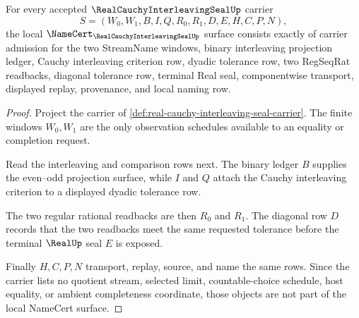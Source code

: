 \begin{theorem}
\label{thm:real-cauchy-interleaving-seal-namecert-obligations}
For every accepted $\RealCauchyInterleavingSealUp$ carrier
$$
S=(W_0,W_1,B,I,Q,R_0,R_1,D,E,H,C,P,N),
$$
the local $\NameCert_{\RealCauchyInterleavingSealUp}$ surface consists exactly of carrier admission for the two StreamName windows, binary interleaving projection ledger, Cauchy interleaving criterion row, dyadic tolerance row, two RegSeqRat readbacks, diagonal tolerance row, terminal Real seal, componentwise transport, displayed replay, provenance, and local naming row.
\end{theorem}
\begin{proof}
Project the carrier of \autoref{def:real-cauchy-interleaving-seal-carrier}. The finite windows $W_0,W_1$ are the only observation schedules available to an equality or completion request.

Read the interleaving and comparison rows next. The binary ledger $B$ supplies the even--odd projection surface, while $I$ and $Q$ attach the Cauchy interleaving criterion to a displayed dyadic tolerance row.

The two regular rational readbacks are then $R_0$ and $R_1$. The diagonal row $D$ records that the two readbacks meet the same requested tolerance before the terminal $\RealUp$ seal $E$ is exposed.

Finally $H,C,P,N$ transport, replay, source, and name the same rows. Since the carrier lists no quotient stream, selected limit, countable-choice schedule, host equality, or ambient completeness coordinate, those objects are not part of the local NameCert surface.
\end{proof}

